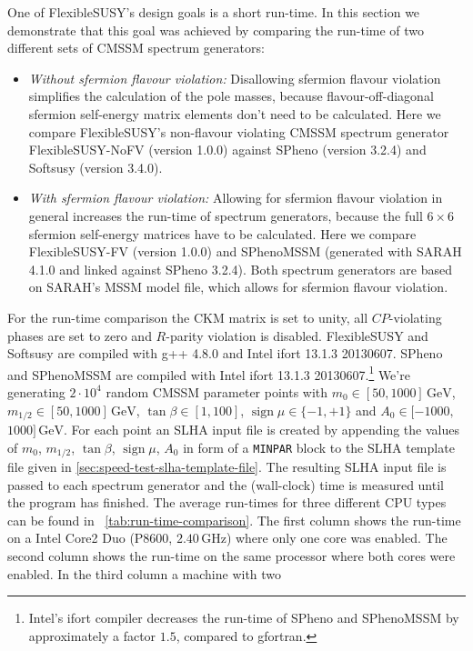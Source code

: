 \documentclass[final,3p,11pt,pdflatex]{elsarticle}
\makeatletter
\newcommand{\fs}{FlexibleSUSY\@\xspace}
\newcommand{\code}[1]{\lstinline|#1|}  %
\newcommand{\unit}[1]{\,\text{#1}}      %
\newcommand{\tabref}[1]{\tablename~\ref{#1}}
\DeclareMathOperator{\sign}{sign}
\makeatother
\begin{document}
One of \fs's design goals is a short run-time.  In this section we
demonstrate that this goal was achieved by comparing the run-time of
two different sets of CMSSM spectrum generators:
%
\begin{itemize}
\item \emph{Without sfermion flavour violation:} Disallowing sfermion
  flavour violation simplifies the calculation of the pole masses,
  because flavour-off-diagonal sfermion self-energy matrix elements
  don't need to be calculated.  Here we compare \fs's non-flavour
  violating CMSSM spectrum generator FlexibleSUSY-NoFV (version 1.0.0)
  against SPheno (version 3.2.4) and Softsusy (version 3.4.0).
%
\item \emph{With sfermion flavour violation:} Allowing for sfermion
  flavour violation in general increases the run-time of spectrum
  generators, because the full $6\times 6$ sfermion self-energy
  matrices have to be calculated.  Here we compare FlexibleSUSY-FV
  (version 1.0.0) and SPhenoMSSM (generated with SARAH 4.1.0 and
  linked against SPheno 3.2.4).  Both spectrum generators are based on
  SARAH's MSSM model file, which allows for sfermion flavour
  violation.
\end{itemize}
%
For the run-time comparison the CKM matrix is set to unity, all
$CP$-violating phases are set to zero and $R$-parity violation is
disabled.  \fs and Softsusy are compiled with g++ 4.8.0 and Intel
ifort 13.1.3 20130607.  SPheno and SPhenoMSSM are compiled with Intel
ifort 13.1.3 20130607.\footnote{Intel's ifort compiler decreases the
  run-time of SPheno and SPhenoMSSM by approximately a factor $1.5$,
  compared to gfortran.}  We're generating $2\cdot 10^{4}$ random
CMSSM parameter points with $m_0\in [50,1000]\unit{GeV}$, $m_{1/2}\in
[50,1000]\unit{GeV}$, $\tan\beta\in [1,100]$, $\sign\mu\in \{-1,+1\}$
and $A_0\in [-1000,$ $1000]\unit{GeV}$.  For each point an SLHA input
file is created by appending the values of $m_0$, $m_{1/2}$,
$\tan\beta$, $\sign\mu$, $A_0$ in form of a \code{MINPAR} block to the
SLHA template file given in \ref{sec:speed-test-slha-template-file}.
The resulting SLHA input file is passed to each spectrum generator and
the (wall-clock) time is measured until the program has finished.  The
average run-times for three different CPU types can be found in
\tabref{tab:run-time-comparison}.  The first column shows the run-time
on a Intel Core2 Duo (P8600, $2.40\unit{GHz}$) where only one core was
enabled.  The second column shows the run-time on the same processor
where both cores were enabled.  In the third column a machine with two
\end{document}
